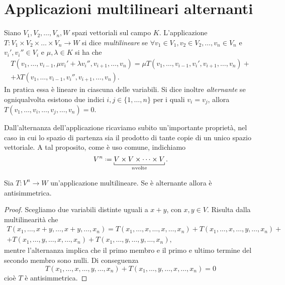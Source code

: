 \section{Applicazioni multilineari alternanti}
\begin{definizione} \label{d:applicazione-multilineare-alternante}
	Siano $V_1,V_2,\dots,V_n,W$ spazi vettoriali sul campo $K$.
	L'applicazione $T\colon V_1\times V_2\times\dots\times V_n\to W$ si dice \emph{multilineare} se $\forall v_1\in V_1,v_2\in V_2,\dots,v_n\in V_n$ e $v_i',v_i''\in V_i$ e $\mu,\lambda\in K$ si ha che
	\begin{multline*}
		T(v_1,\dots,v_{i-1},\mu v_i'+\lambda v_i'',v_{i+1},\dots,v_n)=\mu T(v_1,\dots,v_{i-1},v_i',v_{i+1},\dots,v_n)+\\+\lambda T(v_1,\dots,v_{i-1},v_i'',v_{i+1},\dots,v_n).
	\end{multline*}
	In pratica essa è lineare in ciascuna delle variabili.
	Si dice inoltre \emph{alternante} se ogniqualvolta esistono due indici $i,j\in\{1,\dots,n\}$ per i quali $v_i=v_j$, allora $T(v_1,\dots,v_i,\dots,v_j,\dots,v_n)=0$.
\end{definizione}
Dall'alternanza dell'applicazione ricaviamo subito un'importante proprietà, nel caso in cui lo spazio di partenza sia il prodotto di tante copie di un unico spazio vettoriale.
A tal proposito, come è uso comune, indichiamo
\begin{equation}
	V^n\defeq\underbracket[.5pt]{V\times V\times\cdots\times V}_{n\text{volte}}.
\end{equation}
\begin{teorema} \label{t:alternante-implica-antisimmetrica}
	Sia $T\colon V^n\to W$ un'applicazione multilineare.
	Se è alternante allora è antisimmetrica.
\end{teorema}
\begin{proof}
	Scegliamo due variabili distinte uguali a $x+y$, con $x,y\in V$.
	Risulta dalla multilinearità che
	\begin{multline}
		T(x_1,\dots,x+y,\dots,x+y,\dots,x_n)=T(x_1,\dots,x,\dots,x,\dots,x_n)+T(x_1,\dots,x,\dots,y,\dots,x_n)+\\+T(x_1,\dots,y,\dots,x,\dots,x_n)+T(x_1,\dots,y,\dots,y,\dots,x_n),
	\end{multline}
	mentre l'alternanza implica che il primo membro e il primo e ultimo termine del secondo membro sono nulli.
	Di conseguenza
	\begin{equation}
		T(x_1,\dots,x,\dots,y,\dots,x_n)+T(x_1,\dots,y,\dots,x,\dots,x_n)=0
	\end{equation}
	cioè $T$ è antisimmetrica.
\end{proof}
